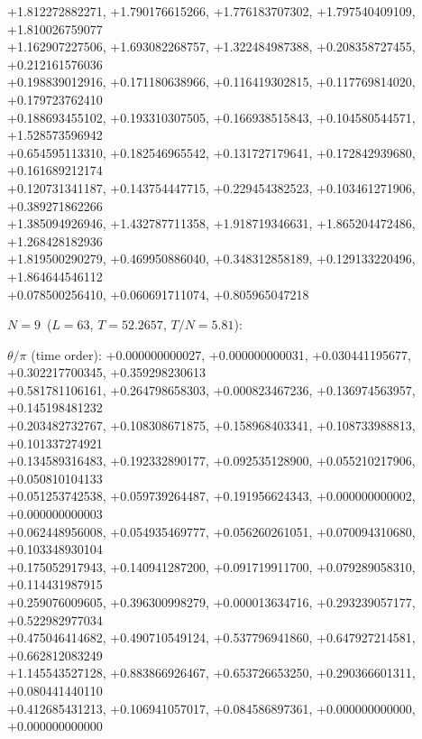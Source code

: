 \begin{flushleft}
+1.812272882271, +1.790176615266, +1.776183707302, +1.797540409109, +1.810026759077 \\
+1.162907227506, +1.693082268757, +1.322484987388, +0.208358727455, +0.212161576036 \\
+0.198839012916, +0.171180638966, +0.116419302815, +0.117769814020, +0.179723762410 \\
+0.188693455102, +0.193310307505, +0.166938515843, +0.104580544571, +1.528573596942 \\
+0.654595113310, +0.182546965542, +0.131727179641, +0.172842939680, +0.161689212174 \\
+0.120731341187, +0.143754447715, +0.229454382523, +0.103461271906, +0.389271862266 \\
+1.385094926946, +1.432787711358, +1.918719346631, +1.865204472486, +1.268428182936 \\
+1.819500290279, +0.469950886040, +0.348312858189, +0.129133220496, +1.864644546112 \\
+0.078500256410, +0.060691711074, +0.805965047218
\vspace{3pt}\par\noindent\textbf{$N=9$}\ ($L=63$, $T=52.2657$, $T/N=5.81$):
\par\noindent$\theta/\pi$ (time order):
+0.000000000027, +0.000000000031, +0.030441195677, +0.302217700345, +0.359298230613 \\
+0.581781106161, +0.264798658303, +0.000823467236, +0.136974563957, +0.145198481232 \\
+0.203482732767, +0.108308671875, +0.158968403341, +0.108733988813, +0.101337274921 \\
+0.134589316483, +0.192332890177, +0.092535128900, +0.055210217906, +0.050810104133 \\
+0.051253742538, +0.059739264487, +0.191956624343, +0.000000000002, +0.000000000003 \\
+0.062448956008, +0.054935469777, +0.056260261051, +0.070094310680, +0.103348930104 \\
+0.175052917943, +0.140941287200, +0.091719911700, +0.079289058310, +0.114431987915 \\
+0.259076009605, +0.396300998279, +0.000013634716, +0.293239057177, +0.522982977034 \\
+0.475046414682, +0.490710549124, +0.537796941860, +0.647927214581, +0.662812083249 \\
+1.145543527128, +0.883866926467, +0.653726653250, +0.290366601311, +0.080441440110 \\
+0.412685431213, +0.106941057017, +0.084586897361, +0.000000000000, +0.000000000000 \\

\end{flushleft}
